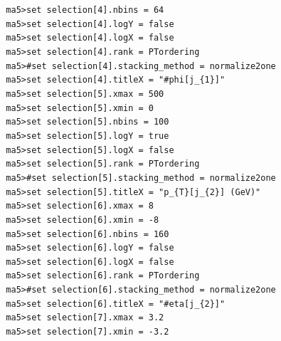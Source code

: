 \documentclass[a4paper, 10pt]{article}
\begin{document}
\texttt{ }\texttt{ }\texttt{ma5>set selection[4].nbins = 64\\
}
\texttt{ }\texttt{ }\texttt{ma5>set selection[4].logY = false\\
}
\texttt{ }\texttt{ }\texttt{ma5>set selection[4].logX = false\\
}
\texttt{ }\texttt{ }\texttt{ma5>set selection[4].rank = PTordering\\
}
\texttt{ }\texttt{ }\texttt{ma5>\#set selection[4].stacking\_method = normalize2one\\
}
\texttt{ }\texttt{ }\texttt{ma5>set selection[4].titleX = "\#phi[j\_\{1\}]"\\
}
\texttt{ }\texttt{ }\texttt{ma5>set selection[5].xmax = 500\\
}
\texttt{ }\texttt{ }\texttt{ma5>set selection[5].xmin = 0\\
}
\texttt{ }\texttt{ }\texttt{ma5>set selection[5].nbins = 100\\
}
\texttt{ }\texttt{ }\texttt{ma5>set selection[5].logY = true\\
}
\texttt{ }\texttt{ }\texttt{ma5>set selection[5].logX = false\\
}
\texttt{ }\texttt{ }\texttt{ma5>set selection[5].rank = PTordering\\
}
\texttt{ }\texttt{ }\texttt{ma5>\#set selection[5].stacking\_method = normalize2one\\
}
\texttt{ }\texttt{ }\texttt{ma5>set selection[5].titleX = "p\_\{T\}[j\_\{2\}] (GeV)"\\
}
\texttt{ }\texttt{ }\texttt{ma5>set selection[6].xmax = 8\\
}
\texttt{ }\texttt{ }\texttt{ma5>set selection[6].xmin = -8\\
}
\texttt{ }\texttt{ }\texttt{ma5>set selection[6].nbins = 160\\
}
\texttt{ }\texttt{ }\texttt{ma5>set selection[6].logY = false\\
}
\texttt{ }\texttt{ }\texttt{ma5>set selection[6].logX = false\\
}
\texttt{ }\texttt{ }\texttt{ma5>set selection[6].rank = PTordering\\
}
\texttt{ }\texttt{ }\texttt{ma5>\#set selection[6].stacking\_method = normalize2one\\
}
\texttt{ }\texttt{ }\texttt{ma5>set selection[6].titleX = "\#eta[j\_\{2\}]"\\
}
\texttt{ }\texttt{ }\texttt{ma5>set selection[7].xmax = 3.2\\
}
\texttt{ }\texttt{ }\texttt{ma5>set selection[7].xmin = -3.2\\
}
\end{document}
